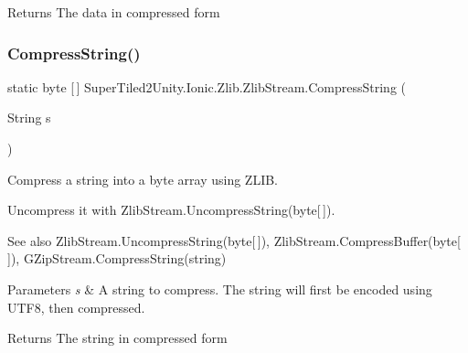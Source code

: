 \begin{DoxyReturn}{Returns}
The data in compressed form
\end{DoxyReturn}
\mbox{\label{class_super_tiled2_unity_1_1_ionic_1_1_zlib_1_1_zlib_stream_a1eacadb410038ea05e574eb2613659ff}} 
\subsubsection{\texorpdfstring{Compress\+String()}{CompressString()}}
{\footnotesize\ttfamily static byte \mbox{[}$\,$\mbox{]} Super\+Tiled2\+Unity.\+Ionic.\+Zlib.\+Zlib\+Stream.\+Compress\+String (\begin{DoxyParamCaption}\item[{String}]{s }\end{DoxyParamCaption})\hspace{0.3cm}{\ttfamily [static]}}



Compress a string into a byte array using Z\+L\+IB. 

Uncompress it with Zlib\+Stream.\+Uncompress\+String(byte\mbox{[}$\,$\mbox{]}). 

\begin{DoxySeeAlso}{See also}
Zlib\+Stream.\+Uncompress\+String(byte\mbox{[}$\,$\mbox{]}), Zlib\+Stream.\+Compress\+Buffer(byte\mbox{[}$\,$\mbox{]}), G\+Zip\+Stream.\+Compress\+String(string)


\end{DoxySeeAlso}



\begin{DoxyParams}{Parameters}
{\em s} & A string to compress. The string will first be encoded using U\+T\+F8, then compressed. \\
\hline
\end{DoxyParams}


\begin{DoxyReturn}{Returns}
The string in compressed form
\end{DoxyReturn}
\mbox{\label{class_super_tiled2_unity_1_1_ionic_1_1_zlib_1_1_zlib_stream_ae7e46e815fe6d5cd5777c4388a096ca2}} 
